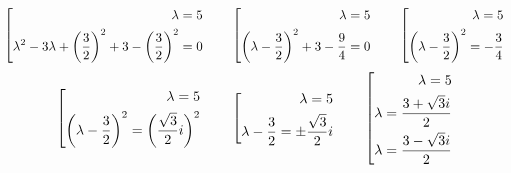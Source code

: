 $$ \left[
\begin{aligned}
	\lambda = 5 \\
    \lambda^2 - 3\lambda + \bigg( \half[3] \bigg)^2 + 3 - \bigg( \half[3] \bigg)^2 = 0
\end{aligned} \right. \qquad \left[
\begin{aligned}
	\lambda = 5 \\
    \bigg( \lambda - \half[3] \bigg)^2 + 3 - \frac94 = 0
\end{aligned} \right. \qquad \left[
\begin{aligned}
	\lambda = 5 \\
    \bigg( \lambda - \half[3] \bigg)^2 = -\frac34
\end{aligned} \right. $$
$$ \left[
\begin{aligned}
	\lambda = 5 \\
    \bigg( \lambda - \half[3] \bigg)^2 = \bigg( \half[\sqrt3]i \bigg)^2
\end{aligned} \right. \qquad \left[
\begin{aligned}
	\lambda = 5 \\
    \lambda - \half[3] = \pm \half[\sqrt3]i
\end{aligned} \right. \qquad \left[
\begin{aligned}
	\lambda = 5 \\
    \lambda = \half[3 + \sqrt3i] \\
    \lambda = \half[3 - \sqrt3i]
\end{aligned} \right. $$

